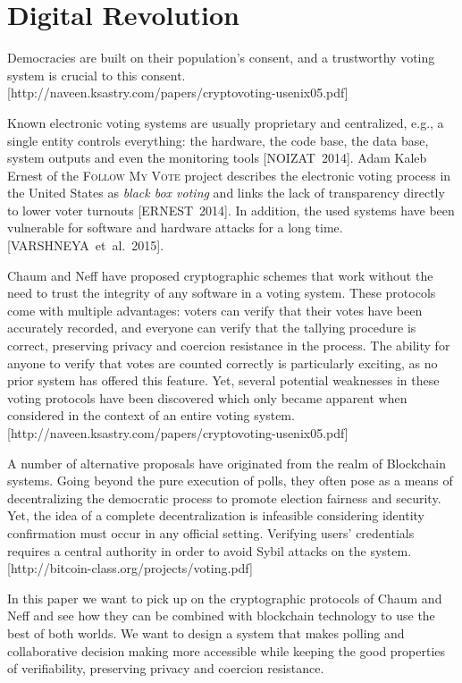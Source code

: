 
\section{Digital Revolution}\label{sec:motivation}

Democracies are built on their population’s consent, and a trustworthy voting system is crucial to this consent. [http://naveen.ksastry.com/papers/cryptovoting-usenix05.pdf]\par

Known electronic voting systems are usually proprietary and centralized, e.g., a single entity controls everything: the hardware, the code base, the data base, system outputs and even the monitoring tools [NOIZAT~2014]. Adam Kaleb Ernest of the \textsc{Follow My Vote} project describes the electronic voting process in the United States as \textit{black box voting} and links the lack of transparency directly to lower voter turnouts [ERNEST~2014]. In addition, the used systems have been vulnerable for software and hardware attacks for a long time. [VARSHNEYA~et~al.~2015].\par

Chaum and Neff have proposed cryptographic schemes that work without the need to trust the integrity of any software in a voting system. These protocols come with multiple advantages: voters can verify that their votes have been accurately recorded, and everyone can verify that the tallying procedure is correct, preserving privacy and coercion resistance in the
process. The ability for anyone to verify that votes are counted correctly is particularly exciting, as no prior system has offered this feature. Yet,  several potential weaknesses in these voting protocols have been discovered which only became apparent when considered in the context of an entire voting system. [http://naveen.ksastry.com/papers/cryptovoting-usenix05.pdf] \par

A number of alternative proposals have originated from the realm of Blockchain systems. Going beyond the pure execution of polls, they often pose as a means of decentralizing the democratic process to promote election fairness and security. Yet, the idea of a complete decentralization is infeasible considering identity confirmation must occur in any official setting. Verifying users’ credentials requires a central authority in order to avoid Sybil attacks on the system. [http://bitcoin-class.org/projects/voting.pdf] \par

In this paper we want to pick up on the cryptographic protocols of Chaum and Neff and see how they can be combined with blockchain technology to use the best of both worlds. We want to design a system that makes polling and collaborative decision making more accessible while keeping the good properties of verifiability, preserving privacy and coercion resistance.\par